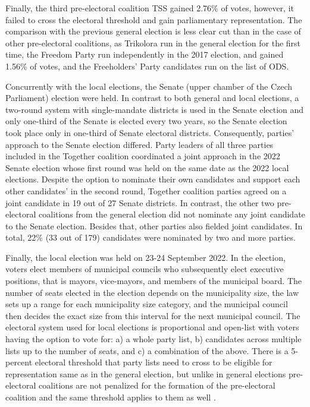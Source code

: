 \documentclass[]{interact}
\theoremstyle{plain}%
\theoremstyle{definition}
\theoremstyle{remark}
\begin{document}
Finally, the third pre-electoral coalition TSS gained 2.76\% of votes, however, it failed to cross the electoral threshold and gain parliamentary representation. The comparison with the previous general election is less clear cut than in the case of other pre-electoral coalitions, as Trikolora run in the general election for the first time, the Freedom Party run independently in the 2017 election, and gained 1.56\% of votes, and the Freeholders' Party candidates run on the list of ODS.

Concurrently with the local elections, the Senate (upper chamber of the Czech Parliament) election were held. In contrast to both general and local elections, a two-round system with single-mandate districts is used in the Senate election and only one-third of the Senate is elected every two years, so the Senate election took place only in one-third of Senate electoral districts. Consequently, parties' approach to the Senate election differed. Party leaders of all three parties included in the Together coalition coordinated a joint approach in the 2022 Senate election whose first round was held on the same date as the 2022 local elections. 
Despite the option to nominate their own candidates and support each other candidates' in the second round, Together coalition parties agreed on a joint candidate in 19 out of 27 Senate districts. In contrast, the other two pre-electoral coalitions from the general election did not nominate any joint candidate to the Senate election. Besides that, other parties also fielded joint candidates. In total, 22\% (33 out of 179) candidates were nominated by two and more parties.

Finally, the local election was held on 23-24 September 2022. In the election, voters elect members of municipal councils who subsequently elect executive positions, that is mayors, vice-mayors, and members of the municipal board. The number of seats elected in the election depends on the municipality size, the law sets up a range for each municipality size category, and the municipal council then decides the exact size from this interval for the next municipal council. The electoral system used for local elections is proportional and open-list with voters having the option to vote for: a) a whole party list, b) candidates across multiple lists up to the number of seats, and c) a combination of the above. There is a 5-percent electoral threshold that party lists need to cross to be eligible for representation same as in the general election, but unlike in general elections pre-electoral coalitions are not penalized for the formation of the pre-electoral coalition and the same threshold applies to them as well \citep{voda2022}.
\end{document}
